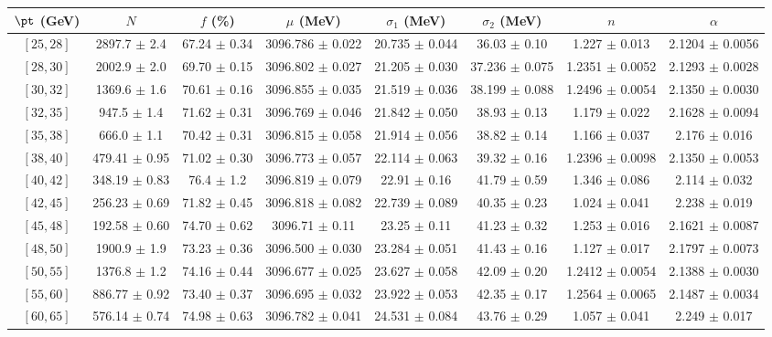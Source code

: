 \begin{tabular}{c||c|c|c|c|c|c|c}
$\pt$ (GeV) & $N$ & $f$ (\%) & $\mu$ (MeV) & $\sigma_1$ (MeV) & $\sigma_2$ (MeV) & $n$ & $\alpha$ \\
\hline
$[25, 28]$ & 2897.7 $\pm$ 2.4 & 67.24 $\pm$ 0.34 & 3096.786 $\pm$ 0.022 & 20.735 $\pm$ 0.044 & 36.03 $\pm$ 0.10 & 1.227 $\pm$ 0.013 & 2.1204 $\pm$ 0.0056\\
$[28, 30]$ & 2002.9 $\pm$ 2.0 & 69.70 $\pm$ 0.15 & 3096.802 $\pm$ 0.027 & 21.205 $\pm$ 0.030 & 37.236 $\pm$ 0.075 & 1.2351 $\pm$ 0.0052 & 2.1293 $\pm$ 0.0028\\
$[30, 32]$ & 1369.6 $\pm$ 1.6 & 70.61 $\pm$ 0.16 & 3096.855 $\pm$ 0.035 & 21.519 $\pm$ 0.036 & 38.199 $\pm$ 0.088 & 1.2496 $\pm$ 0.0054 & 2.1350 $\pm$ 0.0030\\
$[32, 35]$ & 947.5 $\pm$ 1.4 & 71.62 $\pm$ 0.31 & 3096.769 $\pm$ 0.046 & 21.842 $\pm$ 0.050 & 38.93 $\pm$ 0.13 & 1.179 $\pm$ 0.022 & 2.1628 $\pm$ 0.0094\\
$[35, 38]$ & 666.0 $\pm$ 1.1 & 70.42 $\pm$ 0.31 & 3096.815 $\pm$ 0.058 & 21.914 $\pm$ 0.056 & 38.82 $\pm$ 0.14 & 1.166 $\pm$ 0.037 & 2.176 $\pm$ 0.016\\
$[38, 40]$ & 479.41 $\pm$ 0.95 & 71.02 $\pm$ 0.30 & 3096.773 $\pm$ 0.057 & 22.114 $\pm$ 0.063 & 39.32 $\pm$ 0.16 & 1.2396 $\pm$ 0.0098 & 2.1350 $\pm$ 0.0053\\
$[40, 42]$ & 348.19 $\pm$ 0.83 & 76.4 $\pm$ 1.2 & 3096.819 $\pm$ 0.079 & 22.91 $\pm$ 0.16 & 41.79 $\pm$ 0.59 & 1.346 $\pm$ 0.086 & 2.114 $\pm$ 0.032\\
$[42, 45]$ & 256.23 $\pm$ 0.69 & 71.82 $\pm$ 0.45 & 3096.818 $\pm$ 0.082 & 22.739 $\pm$ 0.089 & 40.35 $\pm$ 0.23 & 1.024 $\pm$ 0.041 & 2.238 $\pm$ 0.019\\
$[45, 48]$ & 192.58 $\pm$ 0.60 & 74.70 $\pm$ 0.62 & 3096.71 $\pm$ 0.11 & 23.25 $\pm$ 0.11 & 41.23 $\pm$ 0.32 & 1.253 $\pm$ 0.016 & 2.1621 $\pm$ 0.0087\\
$[48, 50]$ & 1900.9 $\pm$ 1.9 & 73.23 $\pm$ 0.36 & 3096.500 $\pm$ 0.030 & 23.284 $\pm$ 0.051 & 41.43 $\pm$ 0.16 & 1.127 $\pm$ 0.017 & 2.1797 $\pm$ 0.0073\\
$[50, 55]$ & 1376.8 $\pm$ 1.2 & 74.16 $\pm$ 0.44 & 3096.677 $\pm$ 0.025 & 23.627 $\pm$ 0.058 & 42.09 $\pm$ 0.20 & 1.2412 $\pm$ 0.0054 & 2.1388 $\pm$ 0.0030\\
$[55, 60]$ & 886.77 $\pm$ 0.92 & 73.40 $\pm$ 0.37 & 3096.695 $\pm$ 0.032 & 23.922 $\pm$ 0.053 & 42.35 $\pm$ 0.17 & 1.2564 $\pm$ 0.0065 & 2.1487 $\pm$ 0.0034\\
$[60, 65]$ & 576.14 $\pm$ 0.74 & 74.98 $\pm$ 0.63 & 3096.782 $\pm$ 0.041 & 24.531 $\pm$ 0.084 & 43.76 $\pm$ 0.29 & 1.057 $\pm$ 0.041 & 2.249 $\pm$ 0.017\\

\end{tabular}
